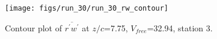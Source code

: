 \begin{figure}[H]
\centering
\texttt{[image: figs/run\_30/run\_30\_rw\_contour]}
\caption{Contour plot of $\overline{r^\prime w^\prime}$ at $z/c$=7.75, $V_{free}$=32.94, station 3.}
\label{fig:run_30_rw_contour}
\end{figure}


